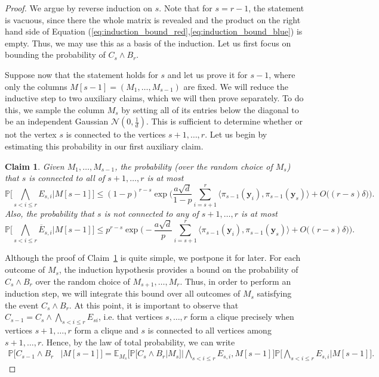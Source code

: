 \documentclass[11pt]{amsart}
\newtheorem{claim}[theorem]{\bf Claim}
\theoremstyle{definition}
\def\cN{\mathcal{N}}
\def\bE{\mathbb{E}}
\def\Pb{\mathbb{P}}
\def\by{\boldsymbol{y}}
\begin{document}
\begin{proof}
We argue by reverse induction on $s$. Note that for $s=r-1$, the statement is vacuous, since there the whole matrix is revealed and the product on the right hand side of Equation (\ref{eq:induction_bound_red},\ref{eq:induction_bound_blue}) is empty. Thus, we may use this as a basis of the induction. Let us first focus on bounding the probability of $C_s\wedge B_r$.

Suppose now that the statement holds for $s$ and let us prove it for $s-1$, where only the columns $M[s-1]=(M_1, \dots, M_{s-1})$ are fixed. We will reduce the inductive step to two auxiliary claims, which we will then prove separately. To do this, we sample the column $M_s$ by setting all of its entries below the diagonal to be an independent Gaussian $\cN(0, \frac{1}{d})$. This is sufficient to determine whether or not the vertex $s$ is connected to the vertices $s+1, \dots, r$. Let us begin by estimating this probability in our first auxiliary claim.

\begin{claim}\label{claim:auxiliary_1}
Given $M_1, \dots, M_{s-1}$, the probability (over the random choice of $M_s$) that $s$ is connected to all of $s+1, \dots, r$ is at most
{\smaller[0.3]
\begin{equation}\label{eq:auxiliary_1_blue}
    \Pb\bigg[\bigwedge_{s<i\leq r}E_{s, i}\bigg|M[s\!-\!1]\bigg]\leq (1\!-\!p)^{r-s}\exp\bigg(\frac{a\sqrt{d}}{1\!-\!p}\sum_{i=s+1}^r \langle \pi_{s-1}(\by_i), \pi_{s-1}(\by_s)\rangle\!+\!O\big((r\!-\!s)\delta\big)\bigg).
\end{equation}
}
Also, the probability that $s$ is not connected to any of $s+1, \dots, r$ is at most
{\smaller[0.3]
\begin{equation}\label{eq:auxiliary_1_red}
    \Pb\bigg[\bigwedge_{s<i\leq r}\overline{E}_{s, i}\bigg|M[s\!-\!1]\bigg]\leq
    p^{r-s}\exp\bigg(\!-\!\frac{a\sqrt{d}}{p}\sum_{i=s+1}^r \langle \pi_{s-1}(\by_i), \pi_{s-1}(\by_s)\rangle\!+\!O\big((r\!-\!s)\delta\big)\bigg).
\end{equation}
}
\end{claim}

Although the proof of Claim~\ref{claim:auxiliary_1} is quite simple, we postpone it for later. For each outcome of $M_s$, the induction hypothesis provides a bound on the probability of $C_s\wedge B_r$ over the random choice of $M_{s+1}, \dots, M_r$. Thus, in order to perform an induction step, we will integrate this bound over all outcomes of $M_s$ satisfying the event $C_s\wedge B_r$. At this point, it is important to observe that $C_{s-1}=C_{s}\wedge \bigwedge_{s<i\leq r}E_{si}$, i.e. that vertices $s, \dots, r$ form a clique precisely when vertices $s+1, \dots, r$ form a clique and $s$ is connected to all vertices among $s+1, \dots, r$. Hence, by the law of total probability, we can write
{\smaller[0.3]
\begin{align}\label{eq:total_probability_blue}
\Pb\Big[C_{s\!-\!1}\wedge B_r&\Big| M[s\!-\!1]\Big] =\bE_{M_s}\bigg[\Pb\Big[C_{s}\wedge B_r\Big| M_{s}\Big]\bigg| \bigwedge_{s<i\leq r}E_{s, i}, M[s\!-\!1]\bigg]\Pb\bigg[\bigwedge_{s<i\leq r}E_{s, i}\bigg|M[s\!-\!1]\bigg].
\end{align}
}


\end{proof}
\end{document}
